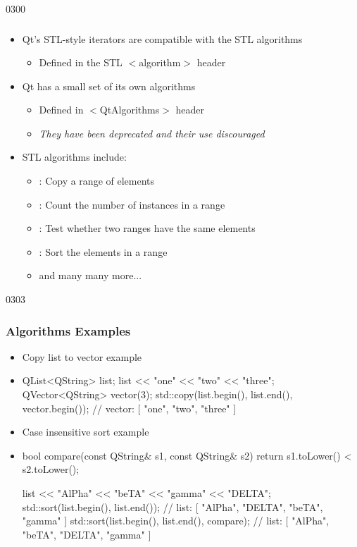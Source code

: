 \begin{slide}{0300}\frametitle{}
\begin{itemize}
  \item Qt's STL-style iterators are compatible with the STL algorithms
  \begin{itemize}
    \item Defined in the STL $<$algorithm$>$ header
  \end{itemize}
  \item Qt has a small set of its own algorithms
  \begin{itemize}
    \item Defined in $<$QtAlgorithms$>$ header
    \item \emph{They have been deprecated and their use discouraged}
  \end{itemize}
  \item STL algorithms include:
    \begin{itemize}
    \item {}: Copy a range of elements
    \item {}: Count the number of instances in a range
    \item {}: Test whether two ranges have the same elements
    \item {}: Sort the elements in a range
    \item and many many more...
    \end{itemize}
\end{itemize}
\end{slide}

\begin{slide}[fragile]{0303}\frametitle{Algorithms Examples}
\begin{itemize}
  \item Copy list to vector example
  \item[] \begin{cpp}
QList<QString> list;
list << "one" << "two" << "three";
QVector<QString> vector(3);
std::copy(list.begin(), list.end(), vector.begin());
// vector: [ "one", "two", "three" ]
  \end{cpp}      
  \item Case insensitive sort example
  \item[] \begin{cpp}
bool compare(const QString& s1, const QString& s2) {
    return s1.toLower() < s2.toLower();
}

list << "AlPha" << "beTA" << "gamma" << "DELTA";
std::sort(list.begin(), list.end());
// list: [ "AlPha", "DELTA", "beTA", "gamma" ]
std::sort(list.begin(), list.end(), compare);
// list: [ "AlPha", "beTA", "DELTA", "gamma" ]
\end{cpp}

  
\end{itemize}
\end{slide}

